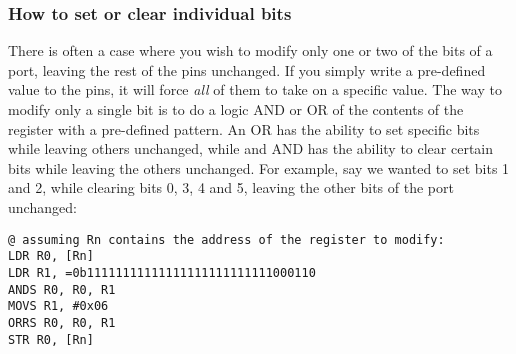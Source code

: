 \subsubsection{How to set or clear individual bits}
\label{sec:set_clear_individual_bits}
There is often a case where you wish to modify only one or two of the bits of a port, leaving the rest of the pins unchanged. If you simply write a pre-defined value to the pins, it will force \emph{all} of them to take on a specific value. The way to modify only a single bit is to do a logic AND or OR of the contents of the register with a pre-defined pattern. An OR has the ability to set specific bits while leaving others unchanged, while and AND has the ability to clear certain bits while leaving the others unchanged. For example, say we wanted to set bits 1 and 2, while clearing bits 0, 3, 4 and 5, leaving the other bits of the port unchanged:
\begin{lstlisting}[fontadjust=true,frame=trBL]
@ assuming Rn contains the address of the register to modify:
LDR R0, [Rn]    
LDR R1, =0b11111111111111111111111111000110
ANDS R0, R0, R1
MOVS R1, #0x06
ORRS R0, R0, R1
STR R0, [Rn]
\end{lstlisting}


